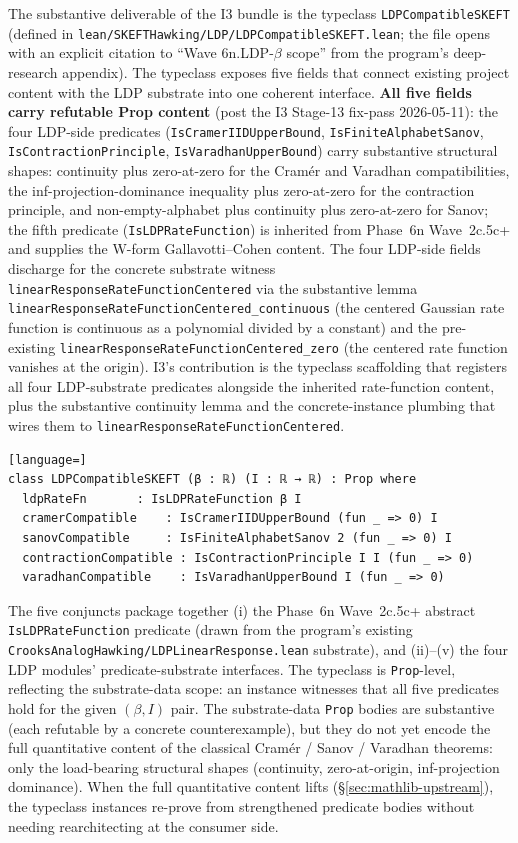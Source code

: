 \documentclass[11pt]{article}
\begin{document}
The substantive deliverable of the I3 bundle is the typeclass
\texttt{LDPCompatibleSKEFT} (defined in
\texttt{lean/SKEFTHawking/LDP/LDPCompatibleSKEFT.lean}; the file
opens with an explicit citation to ``Wave 6n.LDP-$\beta$ scope''
from the program's deep-research appendix). The typeclass exposes
five fields that connect existing project content with the LDP
substrate into one coherent interface. \textbf{All five fields
carry refutable Prop content} (post the I3 Stage-13 fix-pass
2026-05-11): the four LDP-side predicates
(\texttt{IsCramerIIDUpperBound}, \texttt{IsFiniteAlphabetSanov},
\texttt{IsContractionPrinciple}, \texttt{IsVaradhanUpperBound}) carry
substantive structural shapes: continuity plus zero-at-zero for
the Cram\'er and Varadhan compatibilities, the
inf-projection-dominance inequality plus zero-at-zero for the
contraction principle, and non-empty-alphabet plus continuity plus
zero-at-zero for Sanov; the fifth predicate
(\texttt{IsLDPRateFunction}) is inherited from Phase~6n
Wave~2c.5c+ and supplies the W-form Gallavotti--Cohen content. The
four LDP-side fields discharge for the concrete substrate witness
\texttt{linearResponseRateFunctionCentered} via the substantive
lemma \texttt{linearResponseRateFunctionCentered\_continuous} (the
centered Gaussian rate function is continuous as a polynomial
divided by a constant) and the pre-existing
\texttt{linearResponseRateFunctionCentered\_zero} (the centered
rate function vanishes at the origin). I3's contribution is the
typeclass scaffolding that registers all four LDP-substrate
predicates alongside the inherited rate-function content, plus the
substantive continuity lemma and the concrete-instance plumbing
that wires them to \texttt{linearResponseRateFunctionCentered}.

\begin{lstlisting}[language=]
class LDPCompatibleSKEFT (β : ℝ) (I : ℝ → ℝ) : Prop where
  ldpRateFn       : IsLDPRateFunction β I
  cramerCompatible    : IsCramerIIDUpperBound (fun _ => 0) I
  sanovCompatible     : IsFiniteAlphabetSanov 2 (fun _ => 0) I
  contractionCompatible : IsContractionPrinciple I I (fun _ => 0)
  varadhanCompatible    : IsVaradhanUpperBound I (fun _ => 0)
\end{lstlisting}

The five conjuncts package together (i) the Phase~6n Wave~2c.5c+
abstract \texttt{IsLDPRateFunction} predicate (drawn from the
program's existing
\texttt{CrooksAnalogHawking/LDPLinearResponse.lean} substrate), and
(ii)--(v) the four LDP modules' predicate-substrate interfaces. The
typeclass is \texttt{Prop}-level, reflecting the substrate-data
scope: an instance witnesses that all five predicates hold for the
given $(\beta, I)$ pair. The substrate-data \texttt{Prop} bodies
are substantive (each refutable by a concrete counterexample), but
they do not yet encode the full quantitative content of the
classical Cram\'er / Sanov / Varadhan theorems: only the
load-bearing structural shapes (continuity, zero-at-origin,
inf-projection dominance). When the full quantitative content
lifts (\S\ref{sec:mathlib-upstream}), the typeclass instances
re-prove from strengthened predicate bodies without needing
rearchitecting at the consumer side.
\end{document}
